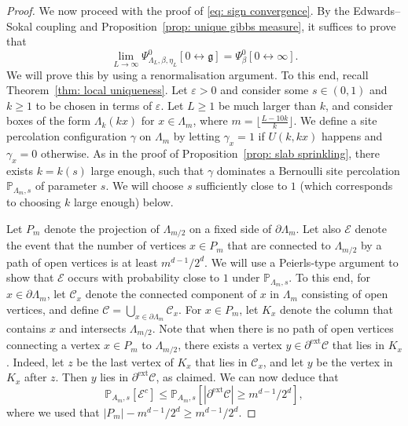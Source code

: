 \documentclass[11pt,a4paper]{article}
\theoremstyle{definition}
\numberwithin{equation}{section}
\newcommand\fg{\mathfrak{g}}
\begin{document}
\begin{proof}
We now proceed with the proof of \eqref{eq: sign convergence}.
By the Edwards--Sokal coupling and Proposition~\ref{prop: unique gibbs measure}, it suffices to prove that 
\begin{equation}\label{eq: theta convergence}
\lim_{L\to\infty} \Psi_{\Lambda_L,\beta,\eta_L}^0[0\longleftrightarrow \fg]= \Psi^0_{\beta}[0\longleftrightarrow \infty].    
\end{equation}
We will prove this by using a renormalisation argument. 
To this end, recall Theorem~\ref{thm: local uniqueness}. Let $\varepsilon>0$ and consider some $s\in (0,1)$ and $k\geq 1$ to be chosen in terms of $\varepsilon$. Let $L\geq 1$ be much larger than $k$, and consider boxes of the form $\Lambda_k(kx)$ for $x\in \Lambda_m$, where $m=\lfloor \frac{L-10k}{k} \rfloor$. We define a site percolation configuration $\gamma$ on $\Lambda_m$ by letting $\gamma_x=1$ if $U(k,kx)$ happens and $\gamma_x=0$ otherwise. As in the proof of Proposition~\ref{prop: slab sprinkling}, there exists $k=k(s)$ large enough, such that $\gamma$ dominates a Bernoulli site percolation $\mathbb{P}_{\Lambda_m,s}$ of parameter $s$. We will choose $s$ sufficiently close to $1$ (which corresponds to choosing $k$ large enough) below.

Let $P_m$ denote the projection of $\Lambda_{m/2}$ on a fixed side of $\partial \Lambda_m$. Let also $\mathcal{E}$ denote the event that the number of vertices $x\in P_m$ that are connected to $\Lambda_{m/2}$ by a path of open vertices is at least $m^{d-1}/2^{d}$. We will use a Peierls-type argument to show that $\mathcal{E}$ occurs with probability close to $1$ under $\mathbb{P}_{\Lambda_m,s}$. To this end, for $x\in \partial \Lambda_m$, let $\mathcal{C}_x$ denote the connected component of $x$ in $\Lambda_m$ consisting of open vertices, and define $\mathcal{C}=\bigcup_{x\in \partial \Lambda_m}\mathcal{C}_x$. For $x\in P_m$, let $K_x$ denote the column that contains $x$ and intersects $\Lambda_{m/2}$. Note that when there is no path of open vertices connecting a vertex $x\in P_m$ to  $\Lambda_{m/2}$, there exists a vertex $y\in \partial^{\mathrm{ext}} \mathcal{C}$ that lies in $K_x$. Indeed, let $z$ be the last vertex of $K_{x}$ that lies in $\mathcal{C}_x$, and let $y$ be the vertex in $K_x$ after $z$. Then $y$ lies in $\partial^{\mathrm{ext}} \mathcal{C}$, as claimed. We can now deduce that
\begin{equation}
\mathbb{P}_{A_m,s}[\mathcal{E}^c]\leq \mathbb{P}_{A_m,s}\left[|\partial^{\mathrm{ext}} \mathcal{C}|\geq m^{d-1}/2^d\right],    
\end{equation}
where we used that $|P_m|-m^{d-1}/2^{d}\geq m^{d-1}/2^{d}$.



\end{proof}
\end{document}

